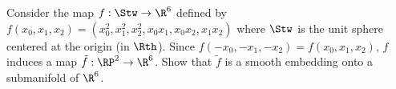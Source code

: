 Consider the map $f:\Stw\rightarrow \R^6$ defined by
$f(x_0,x_1,x_2)=(x_0^2,x_1^2,x_2^2,x_0x_1,x_0x_2,x_1x_2)$ where $\Stw$
is the unit sphere centered at the origin (in $\Rth$). Since
$f(-x_0,-x_1,-x_2)=f(x_0,x_1,x_2)$, $f$ induces a map
$\tilde{f}:\RP^2\rightarrow \R^6$. Show that $\tilde{f}$ is a smooth
embedding onto a submanifold of $\R^6$.
